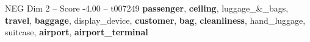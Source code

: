 \begin{textsample}{NEG Dim 2 – Score -4.00 – t007249}  \label{ex:f2_neg_011}
\textbf{passenger}, \textbf{ceiling}, luggage\_\&\_bags, \textbf{travel}, \textbf{baggage}, display\_device, \textbf{customer}, \textbf{bag}, \textbf{cleanliness}, hand\_luggage, suitcase, \textbf{airport}, \textbf{airport\_terminal}

\end{textsample}
